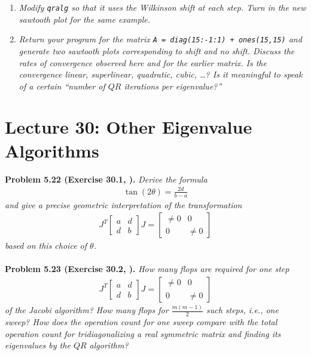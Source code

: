 \documentclass[a4paper,oneside]{book}
\numberwithin{equation}{chapter}
\begin{document}
\begin{enumerate}
\item \textit{Modify \texttt{qralg} so that it uses the Wilkinson shift at each step. Turn in the new sawtooth plot for the same example.}
\item \textit{Return your program for the matrix \texttt{A = diag(15:-1:1) + ones(15,15)} and generate two sawtooth plots corresponding to shift and no shift. Discuss the rates of convergence observed here and for the earlier matrix. Is the convergence linear, superlinear, quadratic, cubic, \ldots ? Is it meaningful to speak of a certain ``number of $QR$ iterations per eigenvalue?''}
\end{enumerate}





\section{Lecture 30: Other Eigenvalue Algorithms}
\textbf{Problem 5.22 (Exercise 30.1, \cite{1}).} \textit{Derive the formula }
\begin{align}
\tan \left( {2\theta } \right) = \frac{{2d}}{{b - a}}
\end{align}
\textit{and give a precise geometric interpretation of the transformation }
\begin{align}
{J^T}\left[ {\begin{array}{*{20}{c}}
a&d\\
d&b
\end{array}} \right]J = \left[ {\begin{array}{*{20}{c}}
{ \ne 0}&0\\
0&{ \ne 0}
\end{array}} \right]
\end{align}
\textit{based on this choice of $\theta$.}\\
\\
\textbf{Problem 5.23 (Exercise 30.2, \cite{1}).} \textit{How many flops are required for one step }
\begin{align}
{J^T}\left[ {\begin{array}{*{20}{c}}
a&d\\
d&b
\end{array}} \right]J = \left[ {\begin{array}{*{20}{c}}
{ \ne 0}&0\\
0&{ \ne 0}
\end{array}} \right]
\end{align}
\textit{of the Jacobi algorithm? How many flops for $\frac{{m\left( {m - 1} \right)}}{2}$ such steps, i.e., one sweep? How does the operation count for one sweep compare with the total operation count for tridiagonalizing a real symmetric matrix and finding its eigenvalues by the $QR$ algorithm?}\\
\end{document}
